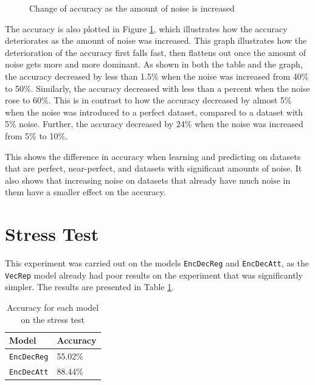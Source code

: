 \begin{figure}[ht]
    \centering
    \captionsetup{justification=centering}
    \caption{Change of accuracy as the amount of noise is increased}
    \label{fig:noise_accuracy}
\end{figure}

The accuracy is also plotted in Figure \ref{fig:noise_accuracy}, which illustrates how the accuracy deteriorates as the amount of noise was increased. This graph illustrates how the deterioration of the accuracy first falls fast, then flattens out once the amount of noise gets more and more dominant. As shown in both the table and the graph, the accuracy decreased by less than 1.5\% when the noise was increased from 40\% to 50\%. Similarly, the accuracy decreased with less than a percent when the noise rose to 60\%. This is in contrast to how the accuracy decreased by almost 5\% when the noise was introduced to a perfect dataset, compared to a dataset with 5\% noise. Further, the accuracy decreased by 24\% when the noise was increased from 5\% to 10\%.

This shows the difference in accuracy when learning and predicting on datasets that are perfect, near-perfect, and datasets with significant amounts of noise. It also shows that increasing noise on datasets that already have much noise in them have a smaller effect on the accuracy.


\section{Stress Test}
\label{sec:stress_test}
This experiment was carried out on the models {\tt EncDecReg} and {\tt EncDecAtt}, as the {\tt VecRep} model already had poor results on the experiment that was significantly simpler. The results are presented in Table \ref{table:accuracy_stress_test}.

\begin{table}[ht]
    \centering
    \begin{tabular}{|l|l|}
        \hline 
        \textbf{Model}                  & \textbf{Accuracy}         \\ \hline
        {\tt EncDecReg}                 & 55.02\%                   \\ \hline
        {\tt EncDecAtt}                 & 88.44\%                   \\ \hline
    \end{tabular}
    \caption{Accuracy for each model on the stress test}
    \label{table:accuracy_stress_test}
\end{table}


